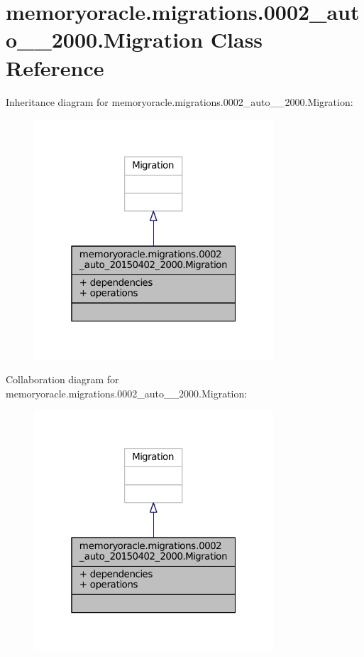\hypertarget{classmemoryoracle_1_1migrations_1_10002__auto__20150402__2000_1_1Migration}{}\section{memoryoracle.\+migrations.0002\+\_\+auto\+\_\+\_\+2000.Migration Class Reference}
\label{classmemoryoracle_1_1migrations_1_10002__auto__20150402__2000_1_1Migration}


Inheritance diagram for memoryoracle.\+migrations.0002\+\_\+auto\+\_\+\_\+2000.Migration\+:\nopagebreak
\begin{figure}[H]
\begin{center}
\leavevmode
\includegraphics[width=253pt]{classmemoryoracle_1_1migrations_1_10002__auto__20150402__2000_1_1Migration__inherit__graph}
\end{center}
\end{figure}


Collaboration diagram for memoryoracle.\+migrations.0002\+\_\+auto\+\_\+\_\+2000.Migration\+:\nopagebreak
\begin{figure}[H]
\begin{center}
\leavevmode
\includegraphics[width=253pt]{classmemoryoracle_1_1migrations_1_10002__auto__20150402__2000_1_1Migration__coll__graph}
\end{center}
\end{figure}
